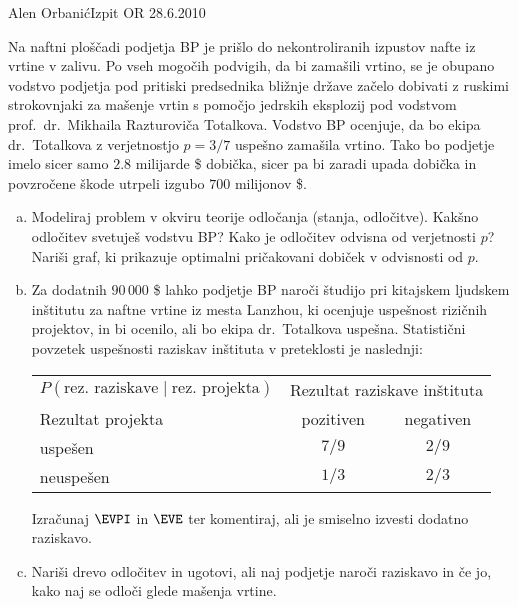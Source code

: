 \begin{naloga}{Alen Orbanić}{Izpit OR 28.6.2010}
\begin{vprasanje}
Na naftni ploščadi podjetja BP
je prišlo do nekontroliranih izpustov nafte iz vrtine v zalivu.
Po vseh mogočih podvigih, da bi zamašili vrtino,
se je ob\-upa\-no vodstvo podjetja pod pritiski predsednika bližnje države
začelo dobivati z ruskimi strokovnjaki
za mašenje vrtin s pomočjo jedrskih eksplozij pod vodstvom
prof.~dr.~Mikhaila Razturoviča Totalkova.
Vodstvo BP ocenjuje, da bo ekipa dr.~Totalkova
z verjetnostjo $p = 3/7$ uspešno zamašila vrtino.
Tako bo podjetje imelo sicer samo $2.8$ milijarde \$ dobička,
sicer pa bi zaradi upada dobička in povzročene škode
utrpeli izgubo $700$ milijonov \$.

\begin{enumerate}[(a)]
\item Modeliraj problem v okviru teorije odločanja (stanja, odločitve).
Kakšno odločitev svetuješ vodstvu BP?
Kako je odločitev odvisna od verjetnosti $p$?
Nariši graf, ki prikazuje optimalni pričakovani dobiček v odvisnosti od $p$.

\item Za dodatnih $90\,000$ \$ lahko podjetje BP naroči študijo
pri kitajskem ljudskem inštitutu za naftne vrtine iz mesta Lanzhou,
ki ocenjuje uspešnost rizičnih projektov,
in bi ocenilo, ali bo ekipa dr.~Totalkova uspešna.
Statistični povzetek uspešnosti raziskav inštituta v preteklosti je naslednji:
\begin{center}
\begin{tabular}{l|cc}
$P(\text{rez.~raziskave} \;|\; \text{rez.~projekta})$ &
\multicolumn{2}{c}{Rezultat raziskave inštituta} \\
Rezultat projekta & pozitiven & negativen \\ \hline
uspešen   &  $7/9$ & $2/9$ \\
neuspešen &  $1/3$ & $2/3$
\end{tabular}
\end{center}
Izračunaj $\EVPI$ in $\EVE$ ter komentiraj,
ali je smiselno izvesti dodatno raz\-iska\-vo.

\item Nariši drevo odločitev in ugotovi,
ali naj podjetje naroči raziskavo in če jo,
kako naj se odloči glede mašenja vrtine.
\end{enumerate}
\end{vprasanje}


\end{naloga}
